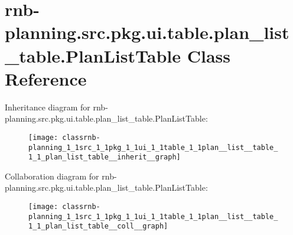 \hypertarget{classrnb-planning_1_1src_1_1pkg_1_1ui_1_1table_1_1plan__list__table_1_1_plan_list_table}{}\section{rnb-\/planning.src.\+pkg.\+ui.\+table.\+plan\+\_\+list\+\_\+table.\+Plan\+List\+Table Class Reference}
\label{classrnb-planning_1_1src_1_1pkg_1_1ui_1_1table_1_1plan__list__table_1_1_plan_list_table}


Inheritance diagram for rnb-\/planning.src.\+pkg.\+ui.\+table.\+plan\+\_\+list\+\_\+table.\+Plan\+List\+Table\+:
\nopagebreak
\begin{figure}[H]
\begin{center}
\leavevmode
\texttt{[image: classrnb-planning\_1\_1src\_1\_1pkg\_1\_1ui\_1\_1table\_1\_1plan\_\_list\_\_table\_1\_1\_plan\_list\_table\_\_inherit\_\_graph]}
\end{center}
\end{figure}


Collaboration diagram for rnb-\/planning.src.\+pkg.\+ui.\+table.\+plan\+\_\+list\+\_\+table.\+Plan\+List\+Table\+:
\nopagebreak
\begin{figure}[H]
\begin{center}
\leavevmode
\texttt{[image: classrnb-planning\_1\_1src\_1\_1pkg\_1\_1ui\_1\_1table\_1\_1plan\_\_list\_\_table\_1\_1\_plan\_list\_table\_\_coll\_\_graph]}
\end{center}
\end{figure}
